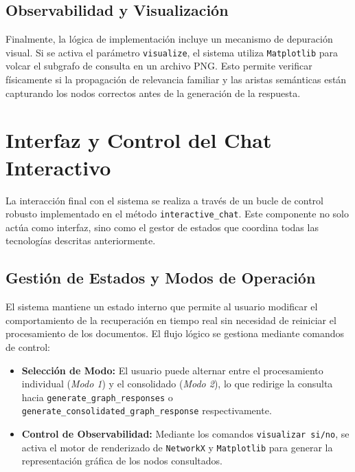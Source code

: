 \subsection{Observabilidad y Visualización}
Finalmente, la lógica de implementación incluye un mecanismo de depuración visual. Si se activa el parámetro \texttt{visualize}, el sistema utiliza \texttt{Matplotlib} para volcar el subgrafo de consulta en un archivo PNG. Esto permite verificar físicamente si la propagación de relevancia familiar y las aristas semánticas están capturando los nodos correctos antes de la generación de la respuesta.

\newpage
\section{Interfaz y Control del Chat Interactivo}

La interacción final con el sistema se realiza a través de un bucle de control robusto implementado en el método \texttt{interactive\_chat}. Este componente no solo actúa como interfaz, sino como el gestor de estados que coordina todas las tecnologías descritas anteriormente.

\subsection{Gestión de Estados y Modos de Operación}
El sistema mantiene un estado interno que permite al usuario modificar el comportamiento de la recuperación en tiempo real sin necesidad de reiniciar el procesamiento de los documentos. El flujo lógico se gestiona mediante comandos de control:
\begin{itemize}
    \item \textbf{Selección de Modo:} El usuario puede alternar entre el procesamiento individual (\textit{Modo 1}) y el consolidado (\textit{Modo 2}), lo que redirige la consulta hacia \texttt{generate\_graph\_responses} o \texttt{generate\_consolidated\_graph\_response} respectivamente.
    \item \textbf{Control de Observabilidad:} Mediante los comandos \texttt{visualizar si/no}, se activa el motor de renderizado de \texttt{NetworkX} y \texttt{Matplotlib} para generar la representación gráfica de los nodos consultados.
\end{itemize}

